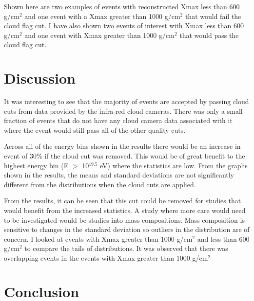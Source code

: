 Shown here are two examples of events with reconstructed Xmax less than 600 g/cm$^{2}$ and one event with a Xmax greater than 1000 g/cm$^{2}$ that would fail the cloud flag cut. I have also shown two events of interest with Xmax less than 600 g/cm$^{2}$ and one event with Xmax greater than 1000 g/cm$^{2}$ that would pass the cloud flag cut.

\section{Discussion}




%
%
%

It was interesting to see that the majority of events are accepted by passing cloud cuts from data provided by the infra-red cloud cameras. There was only a small fraction of events that do not have any cloud camera data associated with it where the event would still pass all of the other quality cuts. 

Across all of the energy bins shown in the results there would be an increase in event of 30\% if the cloud cut was removed. This would be of great benefit to the highest energy bin (E $>$ 10$^{19.5}$ eV) where the statistics are low. From the graphs shown in the results, the means and standard deviations are not significantly different from the distributions when the cloud cuts are applied.

From the results, it can be seen that this cut could be removed for studies that would benefit from the increased statistics. A study where more care would need to be investigated would be studies into mass compositions. Mass composition is sensitive to changes in the standard deviation so outliers in the distribution are of concern. I looked at events with Xmax greater than 1000 g/cm$^2$ and less than 600 g/cm$^2$ to compare the tails of distributions. It was observed that there was overlapping events in the events with Xmax greater than 1000 g/cm$^2$


\section{Conclusion}
